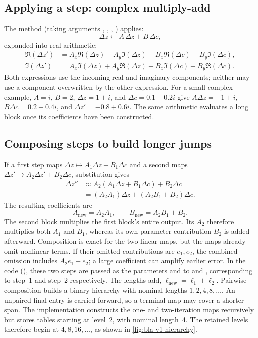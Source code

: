 \subsection{Applying a step: complex multiply-add}
The method  (taking arguments
, ,
, )
applies:
\[
\Delta z \leftarrow A\,\Delta z + B\,\Delta c,
\]
expanded into real arithmetic:
\begin{align}
\Re(\Delta z') &= A_x \Re(\Delta z) - A_y \Im(\Delta z) + B_x \Re(\Delta c) - B_y \Im(\Delta c), \\
\Im(\Delta z') &= A_x \Im(\Delta z) + A_y \Re(\Delta z) + B_x \Im(\Delta c) + B_y \Re(\Delta c).
\end{align}
Both expressions use the incoming real and imaginary components; neither may
use a component overwritten by the other expression. For a small complex
example, $A=i$, $B=2$, $\Delta z=1+i$, and $\Delta c=0.1-0.2i$ give
$A\Delta z=-1+i$, $B\Delta c=0.2-0.4i$, and
$\Delta z'=-0.8+0.6i$. The same arithmetic evaluates a long block once its
coefficients have been constructed.

\subsection{Composing steps to build longer jumps}
If a first step maps \(\Delta z \mapsto A_1\Delta z + B_1\Delta c\) and a second maps
\(\Delta z' \mapsto A_2\Delta z' + B_2\Delta c\), substitution gives
\begin{align*}
\Delta z'' &\approx A_2(A_1\Delta z+B_1\Delta c)+B_2\Delta c\\
            &= (A_2A_1)\Delta z+(A_2B_1+B_2)\Delta c.
\end{align*}
The resulting coefficients are
\begin{equation}
A_{\text{new}} = A_2 A_1,\qquad B_{\text{new}} = A_2 B_1 + B_2.
\label{eq:bla-v1-composition}
\end{equation}
The second block multiplies the first block's entire output. Its $A_2$ therefore
multiplies both $A_1$ and $B_1$, whereas its own parameter contribution $B_2$
is added afterward. Composition is exact for the two linear maps, but the maps
already omit nonlinear terms. If their omitted contributions are $e_1,e_2$,
the combined omission includes $A_2e_1+e_2$; a large coefficient can amplify
earlier error.
In the code (), these two steps are passed as the parameters
 and  to  and , corresponding to
step~1 and step~2 respectively.
The lengths add, $\ell_{\mathrm{new}}=\ell_1+\ell_2$.
Pairwise composition builds a binary hierarchy with nominal lengths
$1,2,4,8,\ldots$. An unpaired final entry is carried forward, so a
terminal map may cover a shorter span. The implementation constructs
the one- and two-iteration maps recursively but stores tables starting
at level~2, with nominal length~4. The retained levels therefore begin
at $4,8,16,\ldots$, as shown in \cref{fig:bla-v1-hierarchy}.

